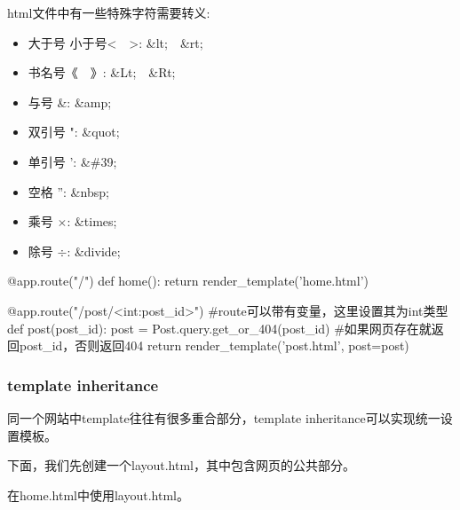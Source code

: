      html文件中有一些特殊字符需要转义:
      \begin{multicols}{2}
        \begin{itemize}
          \item 大于号 小于号<~~>: \&lt;~~\&rt;
          \item 书名号《~~》: \&Lt;~~\&Rt;
          \item 与号 \&: \&amp;
          \item 双引号 ": \&quot;
          \item 单引号 ': \&\#39;
          \item 空格 '': \&nbsp;
          \item 乘号 $\times$: \&times;
          \item 除号 $\div$: \&divide;
        \end{itemize}
      \end{multicols}

      \begin{codeblock}[language=python, caption={using template in my\_app.py}]
        @app.route("/")
        def home():
            return render_template('home.html')

        @app.route("/post/<int:post_id>") #route可以带有变量，这里设置其为int类型
        def post(post_id):
            post = Post.query.get_or_404(post_id) #如果网页存在就返回post\_id，否则返回404
            return render_template('post.html', post=post)
      \end{codeblock}

    \subsubsection{template inheritance}
      同一个网站中template往往有很多重合部分，template inheritance可以实现统一设置模板。

      下面，我们先创建一个layout.html，其中包含网页的公共部分。 

      在home.html中使用layout.html。

